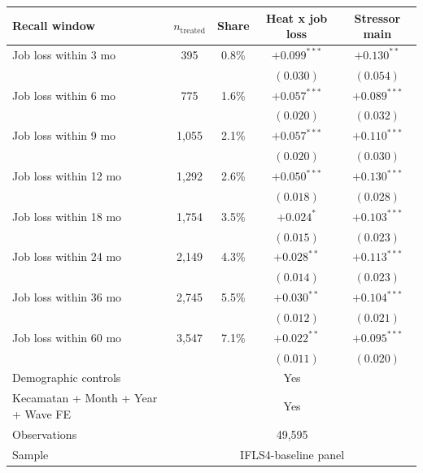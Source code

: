 \begin{tabular}{lcccc}
\toprule
Recall window & $n_{\mathrm{treated}}$ & Share & Heat x job loss & Stressor main \\
\midrule
\quad Job loss within 3 mo & 395 & 0.8\% & $+0.099^{***}$ & $+0.130^{**}$ \\
 &  &  & $(0.030)$ & $(0.054)$ \\
\addlinespace[2pt]
\quad Job loss within 6 mo & 775 & 1.6\% & $+0.057^{***}$ & $+0.089^{***}$ \\
 &  &  & $(0.020)$ & $(0.032)$ \\
\addlinespace[2pt]
\quad Job loss within 9 mo & 1,055 & 2.1\% & $+0.057^{***}$ & $+0.110^{***}$ \\
 &  &  & $(0.020)$ & $(0.030)$ \\
\addlinespace[2pt]
\quad Job loss within 12 mo & 1,292 & 2.6\% & $+0.050^{***}$ & $+0.130^{***}$ \\
 &  &  & $(0.018)$ & $(0.028)$ \\
\addlinespace[2pt]
\quad Job loss within 18 mo & 1,754 & 3.5\% & $+0.024^{*}$ & $+0.103^{***}$ \\
 &  &  & $(0.015)$ & $(0.023)$ \\
\addlinespace[2pt]
\quad Job loss within 24 mo & 2,149 & 4.3\% & $+0.028^{**}$ & $+0.113^{***}$ \\
 &  &  & $(0.014)$ & $(0.023)$ \\
\addlinespace[2pt]
\quad Job loss within 36 mo & 2,745 & 5.5\% & $+0.030^{**}$ & $+0.104^{***}$ \\
 &  &  & $(0.012)$ & $(0.021)$ \\
\addlinespace[2pt]
\quad Job loss within 60 mo & 3,547 & 7.1\% & $+0.022^{**}$ & $+0.095^{***}$ \\
 &  &  & $(0.011)$ & $(0.020)$ \\
\addlinespace[2pt]
\midrule
Demographic controls & \multicolumn{4}{c}{Yes} \\
Kecamatan + Month + Year + Wave FE & \multicolumn{4}{c}{Yes} \\
\addlinespace[3pt]
Observations & \multicolumn{4}{c}{49,595} \\
Sample & \multicolumn{4}{c}{IFLS4-baseline panel} \\
\bottomrule
\end{tabular}
